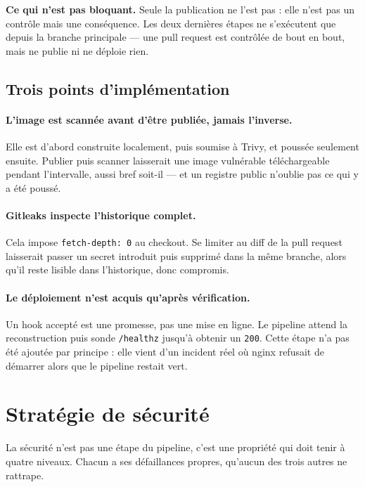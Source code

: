 \documentclass[11pt,a4paper]{article}
\newcommand{\code}[1]{{\shorthandoff{:;!?}\texttt{#1}}}
\begin{document}
\textbf{Ce qui n'est pas bloquant.} Seule la publication ne l'est pas : elle
n'est pas un contrôle mais une conséquence. Les deux dernières étapes ne
s'exécutent que depuis la branche principale — une pull request est
contrôlée de bout en bout, mais ne publie ni ne déploie rien.

\subsection{Trois points d'implémentation}

\paragraph{L'image est scannée avant d'être publiée, jamais l'inverse.}
Elle est d'abord construite localement, puis soumise à Trivy, et poussée
seulement ensuite. Publier puis scanner laisserait une image vulnérable
téléchargeable pendant l'intervalle, aussi bref soit-il — et un registre
public n'oublie pas ce qui y a été poussé.

\paragraph{Gitleaks inspecte l'historique complet.} Cela impose
\code{fetch-depth: 0} au checkout. Se limiter au diff de la pull request
laisserait passer un secret introduit puis supprimé dans la même branche,
alors qu'il reste lisible dans l'historique, donc compromis.

\paragraph{Le déploiement n'est acquis qu'après vérification.} Un hook
accepté est une promesse, pas une mise en ligne. Le pipeline attend la
reconstruction puis sonde \texttt{/healthz} jusqu'à obtenir un
\texttt{200}. Cette étape n'a pas été ajoutée par principe : elle vient d'un
incident réel où nginx refusait de démarrer alors que le pipeline restait
vert.

\section{Stratégie de sécurité}
\label{sec:securite}

La sécurité n'est pas une étape du pipeline, c'est une propriété qui doit
tenir à quatre niveaux. Chacun a ses défaillances propres, qu'aucun des
trois autres ne rattrape.
\end{document}
